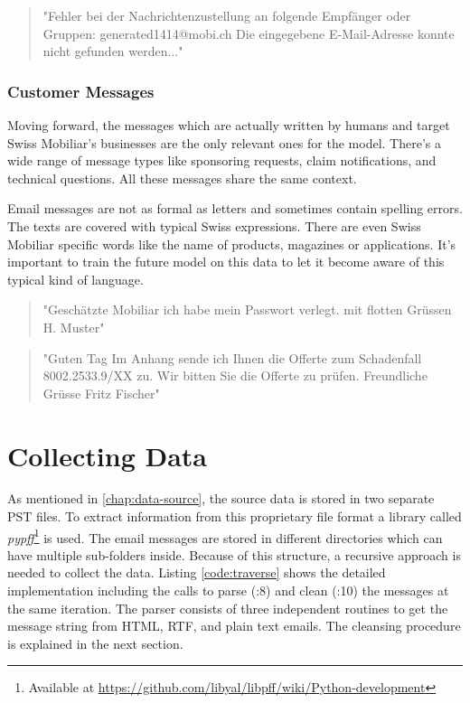 \begin{quote}
    "Fehler bei der Nachrichtenzustellung an folgende Empfänger oder Gruppen: generated1414@mobi.ch Die eingegebene E-Mail-Adresse konnte nicht gefunden werden..."
\end{quote}

\subsubsection{Customer Messages}

Moving forward, the messages which are actually written by humans and target Swiss Mobiliar's businesses are the only relevant ones for the model. There's a wide range of message types like sponsoring requests, claim notifications, and technical questions. All these messages share the same context.

Email messages are not as formal as letters and sometimes contain spelling errors. The texts are covered with typical Swiss expressions. There are even Swiss Mobiliar specific words like the name of products, magazines or applications. It's important to train the future model on this data to let it become aware of this typical kind of language.

\begin{quote}
    "Geschätzte Mobiliar ich habe mein Passwort verlegt. mit flotten Grüssen H. Muster"
\end{quote}

\begin{quote}
    "Guten Tag Im Anhang sende ich Ihnen die Offerte zum Schadenfall 8002.2533.9/XX zu. Wir bitten Sie die Offerte zu prüfen. Freundliche Grüsse Fritz Fischer"
\end{quote}

\section{Collecting Data}

As mentioned in \ref{chap:data-source}, the source data is stored in two separate PST files. To extract information from this proprietary file format a library called \emph{pypff}\footnote{Available at \url{https://github.com/libyal/libpff/wiki/Python-development}} is used. The email messages are stored in different directories which can have multiple sub-folders inside. Because of this structure, a recursive approach is needed to collect the data. Listing \ref{code:traverse} shows the detailed implementation including the calls to parse (:8) and clean (:10) the messages at the same iteration. The parser consists of three independent routines to get the message string from HTML, RTF, and plain text emails. The cleansing procedure is explained in the next section.


